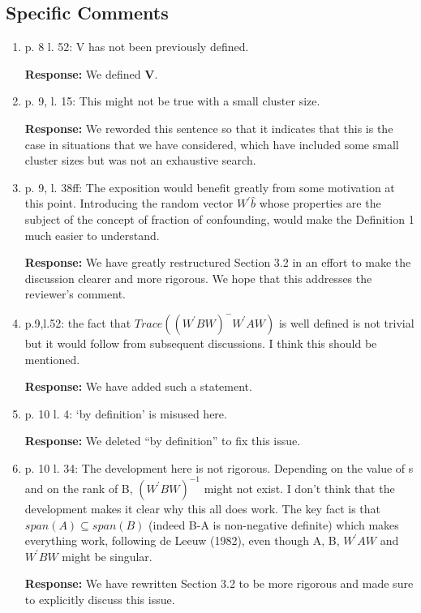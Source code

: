 \documentclass[11pt]{article}
\begin{document}
\subsection*{Specific Comments}

\begin{enumerate}
\item p. 8 l. 52: V has not been previously defined.

\textbf{Response:} We defined $\mathbf{V}$.

\item p. 9, l. 15: This might not be true with a small cluster size.

\textbf{Response:} We reworded this sentence so that it indicates that this is the case in situations that we have considered, which have included some small cluster sizes but was not an exhaustive search.

\item p. 9, l. 38ff: The exposition would benefit greatly from some motivation at this point.
Introducing the random vector $W^\prime \widehat{b}$ whose properties are the subject of the concept of fraction of confounding, would make the Definition 1 much easier to understand.

\textbf{Response:} We have greatly restructured Section 3.2 in an effort to make the discussion clearer and more rigorous. We hope that this addresses the reviewer's comment.

\item p.9,l.52: the  fact that $Trace((W^\prime BW)^-W^\prime AW)$ is well defined is not trivial but it would follow from subsequent discussions. I think this should be mentioned.

\textbf{Response:} We have added such a statement.

\item p. 10 l. 4: `by definition' is misused here.

\textbf{Response:} We deleted ``by definition'' to fix this issue.

\item p. 10 l. 34: The development here is not rigorous. Depending on the value of s and on the
rank of B, $(W^\prime BW )^{-1}$ might not exist. I don't think that the development makes it clear
why this all does work. The key fact is that $span(A) \subseteq span(B)$ (indeed B-A is non-negative definite) which makes everything work, following de Leeuw (1982), even though A, B, $W^\prime AW$ and $W^\prime BW$ might be singular.

\textbf{Response:} We have rewritten Section 3.2 to be more rigorous and made sure to explicitly discuss this issue.


\end{enumerate}
\end{document}
